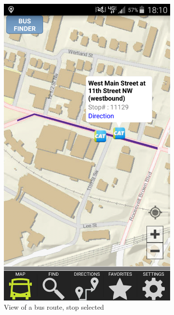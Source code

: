 \documentclass[12pt,letterpaper]{article}
\begin{document}
\begin{figure}[ph!]
\centering
\begin{subfigure}{.5\textwidth}
  \centering
  \includegraphics[width=.9\linewidth]{CAT_mobile_1}
  \caption{View of a bus route, stop selected}
  \label{fig:cat_mobile_1}
\end{subfigure}%
\begin{subfigure}{.5\textwidth}
  \centering

\end{subfigure}
\end{figure}
\end{document}
